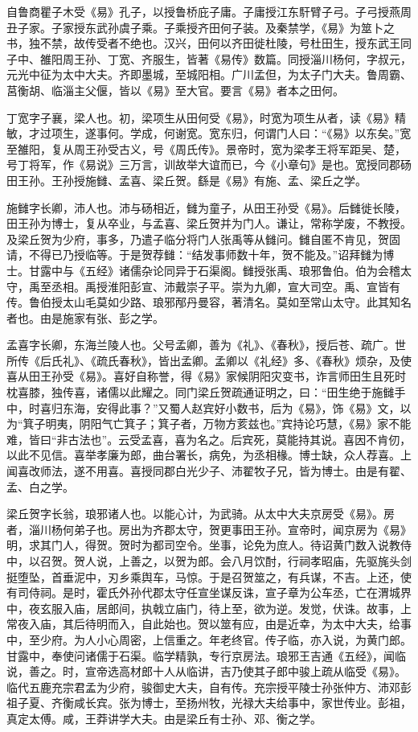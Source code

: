\documentclass[12pt,UTF8]{ctexbook}
\begin{document}
自鲁商瞿子木受《易》孔子，以授鲁桥庇子庸。子庸授江东馯臂子弓。子弓授燕周丑子家。子家授东武孙虞子乘。子乘授齐田何子装。及秦禁学，《易》为筮卜之书，独不禁，故传受者不绝也。汉兴，田何以齐田徙杜陵，号杜田生，授东武王同子中、雒阳周王孙、丁宽、齐服生，皆著《易传》数篇。同授淄川杨何，字叔元，元光中征为太中大夫。齐即墨城，至城阳相。广川孟但，为太子门大夫。鲁周霸、莒衡胡、临淄主父偃，皆以《易》至大官。要言《易》者本之田何。



丁宽字子襄，梁人也。初，梁项生从田何受《易》，时宽为项生从者，读《易》精敏，才过项生，遂事何。学成，何谢宽。宽东归，何谓门人曰：“《易》以东矣。”宽至雒阳，复从周王孙受古义，号《周氏传》。景帝时，宽为梁孝王将军距吴、楚，号丁将军，作《易说》三万言，训故举大谊而已，今《小章句》是也。宽授同郡砀田王孙。王孙授施雠、孟喜、梁丘贺。繇是《易》有施、孟、梁丘之学。



施雠字长卿，沛人也。沛与砀相近，雠为童子，从田王孙受《易》。后雠徙长陵，田王孙为博士，复从卒业，与孟喜、梁丘贺并为门人。谦让，常称学废，不教授。及梁丘贺为少府，事多，乃遣子临分将门人张禹等从雠问。雠自匿不肯见，贺固请，不得已乃授临等。于是贺荐雠：“结发事师数十年，贺不能及。”诏拜雠为博士。甘露中与《五经》诸儒杂论同异于石渠阁。雠授张禹、琅邪鲁伯。伯为会稽太守，禹至丞相。禹授淮阳彭宣、沛戴崇子平。崇为九卿，宣大司空。禹、宣皆有传。鲁伯授太山毛莫如少路、琅邪邴丹曼容，著清名。莫如至常山太守。此其知名者也。由是施家有张、彭之学。



孟喜字长卿，东海兰陵人也。父号孟卿，善为《礼》、《春秋》，授后苍、疏广。世所传《后氏礼》、《疏氏春秋》，皆出孟卿。孟卿以《礼经》多、《春秋》烦杂，及使喜从田王孙受《易》。喜好自称誉，得《易》家候阴阳灾变书，诈言师田生且死时枕喜膝，独传喜，诸儒以此耀之。同门梁丘贺疏通证明之，曰：“田生绝于施雠手中，时喜归东海，安得此事？”又蜀人赵宾好小数书，后为《易》，饰《易》文，以为“箕子明夷，阴阳气亡箕子；箕子者，万物方荄兹也。”宾持论巧慧，《易》家不能难，皆曰“非古法也”。云受孟喜，喜为名之。后宾死，莫能持其说。喜因不肯仞，以此不见信。喜举孝廉为郎，曲台署长，病免，为丞相椽。博士缺，众人荐喜。上闻喜改师法，遂不用喜。喜授同郡白光少子、沛翟牧子兄，皆为博士。由是有翟、孟、白之学。



梁丘贺字长翁，琅邪诸人也。以能心计，为武骑。从太中大夫京房受《易》。房者，淄川杨何弟子也。房出为齐郡太守，贺更事田王孙。宣帝时，闻京房为《易》明，求其门人，得贺。贺时为都司空令。坐事，论免为庶人。待诏黄门数入说教侍中，以召贺。贺人说，上善之，以贺为郎。会八月饮酎，行祠孝昭庙，先驱旄头剑挺堕坠，首垂泥中，刃乡乘舆车，马惊。于是召贺筮之，有兵谋，不吉。上还，使有司侍祠。是时，霍氏外孙代郡太守任宣坐谋反诛，宣子章为公车丞，亡在渭城界中，夜玄服入庙，居郎间，执戟立庙门，待上至，欲为逆。发觉，伏诛。故事，上常夜入庙，其后待明而入，自此始也。贺以筮有应，由是近幸，为太中大夫，给事中，至少府。为人小心周密，上信重之。年老终官。传子临，亦入说，为黄门郎。甘露中，奉使问诸儒于石渠。临学精孰，专行京房法。琅邪王吉通《五经》，闻临说，善之。时，宣帝选高材郎十人从临讲，吉乃使其子郎中骏上疏从临受《易》。临代五鹿充宗君孟为少府，骏御史大夫，自有传。充宗授平陵士孙张仲方、沛邓彭祖子夏、齐衡咸长宾。张为博士，至扬州牧，光禄大夫给事中，家世传业。彭祖，真定太傅。咸，王莽讲学大夫。由是梁丘有士孙、邓、衡之学。
\end{document}
